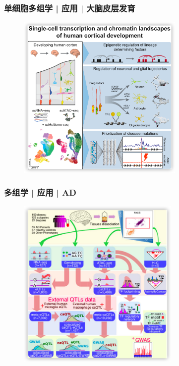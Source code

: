 \documentclass[11pt]{ctexbeamer}
\begin{document}
\begin{frame}
	\frametitle{单细胞多组学 | 应用 | 大脑皮层发育}
	\begin{figure}
		\includegraphics[width=0.72\textwidth]{omics_example_04.png}
	\end{figure}
\end{frame}

\begin{frame}
	\frametitle{多组学 | 应用 | AD}
			\begin{figure}
		\includegraphics[width=0.7\textwidth]{omics_example_01.png}
	\end{figure}
\end{frame}
\end{document}
